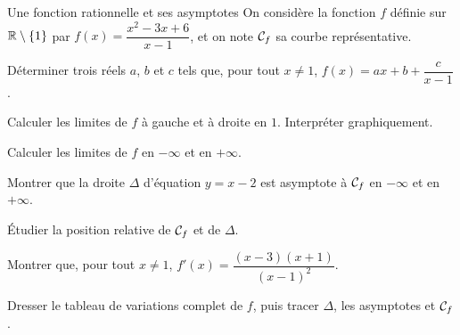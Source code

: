 \begin{exercice}[3]{Une fonction rationnelle et ses asymptotes}
On considère la fonction $f$ définie sur $\mathbb{R}\setminus\{1\}$ par $f(x)=\dfrac{x^{2}-3x+6}{x-1}$, et on note
$\mathcal{C}_f$ sa courbe représentative.
\begin{questions}
  \item Déterminer trois réels $a$, $b$ et $c$ tels que, pour tout $x\neq1$, $f(x)=ax+b+\dfrac{c}{x-1}$.
  \item Calculer les limites de $f$ à gauche et à droite en $1$. Interpréter graphiquement.
  \item Calculer les limites de $f$ en $-\infty$ et en $+\infty$.
  \item Montrer que la droite $\Delta$ d'équation $y=x-2$ est asymptote à $\mathcal{C}_f$ en $-\infty$ et en $+\infty$.
  \item Étudier la position relative de $\mathcal{C}_f$ et de $\Delta$.
\end{questions}
\begin{questions}[resume]
  \item Montrer que, pour tout $x\neq1$, $f'(x)=\dfrac{(x-3)(x+1)}{(x-1)^{2}}$.
  \item Dresser le tableau de variations complet de $f$, puis tracer $\Delta$, les asymptotes et $\mathcal{C}_f$.
\end{questions}
\end{exercice}

